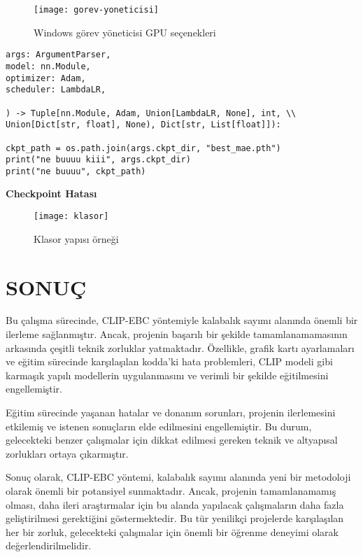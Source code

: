 \documentclass[10pt,a4paper]{report}
\begin{document}
\begin{justify}
\begin{landscape}
	
\begin{figure}[!h] %
		\centering
		
		
		\begin{minipage}[b]{0.970\linewidth}
			\centering
			\texttt{[image: gorev-yoneticisi]}
			\caption{Windows görev yöneticisi GPU seçenekleri}
		\end{minipage}\hfill
		
		
\end{figure}
	
\end{landscape}

\end{justify}


\begin{verbatim}
args: ArgumentParser,
model: nn.Module,
optimizer: Adam,
scheduler: LambdaLR,
	
) -> Tuple[nn.Module, Adam, Union[LambdaLR, None], int, \\
Union[Dict[str, float], None), Dict[str, List[float]]):
	
ckpt_path = os.path.join(args.ckpt_dir, "best_mae.pth")
print("ne buuuu kiii", args.ckpt_dir)
print("ne buuuu", ckpt_path)
\end{verbatim}
\centering \textbf{Checkpoint Hatası}
\begin{figure}[!h]
	
	\centering
	\texttt{[image: klasor]}
	\caption{Klasor yapısı örneği }
	
\end{figure}

\RaggedRight \section{SONUÇ}
\begin{justify}
Bu çalışma sürecinde, CLIP-EBC yöntemiyle kalabalık sayımı alanında önemli bir ilerleme sağlanmıştır. Ancak, projenin başarılı bir şekilde tamamlanamamasının arkasında çeşitli teknik zorluklar yatmaktadır. Özellikle, grafik kartı ayarlamaları ve eğitim sürecinde karşılaşılan kodda'ki hata problemleri, CLIP modeli gibi karmaşık yapılı modellerin uygulanmasını ve verimli bir şekilde eğitilmesini engellemiştir.

Eğitim sürecinde yaşanan hatalar ve donanım sorunları, projenin ilerlemesini etkilemiş ve istenen sonuçların elde edilmesini engellemiştir. Bu durum, gelecekteki benzer çalışmalar için dikkat edilmesi gereken teknik ve altyapısal zorlukları ortaya çıkarmıştır.

Sonuç olarak, CLIP-EBC yöntemi, kalabalık sayımı alanında yeni bir metodoloji olarak önemli bir potansiyel sunmaktadır. Ancak, projenin tamamlanamamış olması, daha ileri araştırmalar için bu alanda yapılacak çalışmaların daha fazla geliştirilmesi gerektiğini göstermektedir. Bu tür yenilikçi projelerde karşılaşılan her bir zorluk, gelecekteki çalışmalar için önemli bir öğrenme deneyimi olarak değerlendirilmelidir.
\end{justify}
	
	
	
	
	
	 
\end{document}
